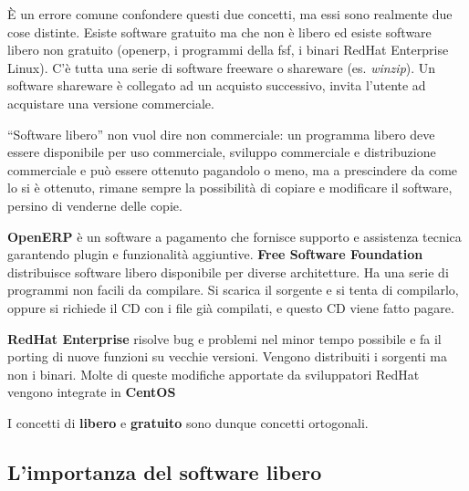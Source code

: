 È un errore comune confondere questi due concetti, ma essi sono realmente due cose distinte. Esiste software gratuito ma che non è libero ed esiste software libero non gratuito (openerp, i programmi della fsf, i binari RedHat Enterprise Linux). C'è tutta una serie di software freeware o shareware (es. \textit{winzip}). Un software shareware è collegato ad un acquisto successivo, invita l'utente ad acquistare una versione commerciale.

``Software libero'' non vuol dire non commerciale: un programma libero deve essere disponibile per uso commerciale, sviluppo commerciale e distribuzione commerciale e può essere ottenuto pagandolo o meno, ma a prescindere da come lo si è ottenuto, rimane sempre la possibilità di copiare e modificare il software, persino di venderne delle copie.

\textbf{OpenERP} è un software a pagamento che fornisce supporto e assistenza tecnica garantendo plugin e funzionalità aggiuntive. 
\textbf{Free Software Foundation} distribuisce software libero disponibile per diverse architetture. Ha una serie di programmi non facili da compilare. Si scarica il sorgente e si tenta di compilarlo, oppure si richiede il CD con i file già compilati, e questo CD viene fatto pagare.

\textbf{RedHat Enterprise} risolve bug e problemi nel minor tempo possibile e fa il porting di nuove funzioni su vecchie versioni. Vengono distribuiti i sorgenti ma non i binari. Molte di queste modifiche apportate da sviluppatori RedHat vengono integrate in \textbf{CentOS}

I concetti di \textbf{libero} e \textbf{gratuito} sono dunque concetti ortogonali.

\subsection{L'importanza del software libero}

